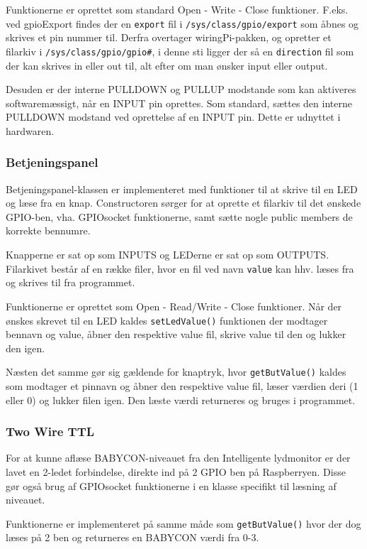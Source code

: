 Funktionerne er oprettet som standard Open - Write - Close funktioner. F.eks. ved gpioExport findes der en \verb+export+ fil i \verb+/sys/class/gpio/export+ som åbnes og skrives et pin nummer til. Derfra overtager wiringPi-pakken, og opretter et filarkiv i \verb+/sys/class/gpio/gpio#+, i denne sti ligger der så en \verb+direction+ fil som der kan skrives in eller out til, alt efter om man ønsker input eller output.

Desuden er der interne PULLDOWN og PULLUP modstande som kan aktiveres softwaremæssigt, når en INPUT pin oprettes. Som standard, sættes den interne PULLDOWN modstand ved oprettelse af en INPUT pin. Dette er udnyttet i hardwaren.

\subsubsection*{Betjeningspanel}

Betjeningspanel-klassen er implementeret med funktioner til at skrive til en LED og læse fra en knap. Constructoren sørger for at oprette et filarkiv til det ønskede GPIO-ben, vha. GPIOsocket funktionerne, samt sætte nogle public members de korrekte bennumre. 

Knapperne er sat op som INPUTS og LEDerne er sat op som OUTPUTS. Filarkivet består af en række filer, hvor en fil ved navn \verb+value+ kan hhv. læses fra og skrives til fra programmet.

Funktionerne er oprettet som Open - Read/Write - Close funktioner. Når der ønskes skrevet til en LED kaldes \verb+setLedValue()+ funktionen der modtager bennavn og value, åbner den respektive value fil, skrive value til den og lukker den igen.

Næsten det samme gør sig gældende for knaptryk, hvor \verb+getButValue()+ kaldes som modtager et pinnavn og åbner den respektive value fil, læser værdien deri (1 eller 0) og lukker filen igen. Den læste værdi returneres og bruges i programmet. 

\subsubsection*{Two Wire TTL}

For at kunne aflæse BABYCON-niveauet fra den Intelligente lydmonitor er der lavet en 2-ledet forbindelse, direkte ind på 2 GPIO ben på Raspberryen. Disse gør også brug af GPIOsocket funktionerne i en klasse specifikt til læsning af niveauet.

Funktionerne er implementeret på samme måde som \verb+getButValue()+ hvor der dog læses på 2 ben og returneres en BABYCON værdi fra 0-3.

